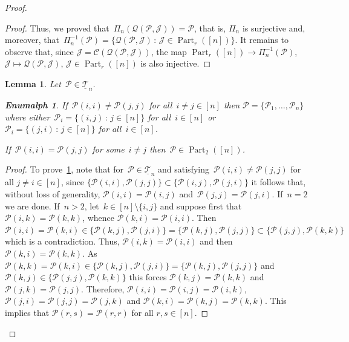 \documentclass[10pt,a4paper]{amsart}
\newtheorem{lemma}{Lemma}
\newtheorem{enumalph}{Enumalph}
\DeclareMathOperator{\Part}{Part}
\begin{document}
\begin{proof}
\begin{proof}
Thus, we proved that~$\Pi_n(\mathcal Q(\mathcal P,\mathcal J))=
\mathcal P$, that is, $\Pi_n$ is surjective and, moreover,
that~$\Pi^{-1}_n(\mathcal P)=\{ \mathcal Q(\mathcal P,\mathcal J)\,:\,
\mathcal J\in \Part_r([n])\}$. It remains to observe that,
since $\mathcal J=\mathcal C(\mathcal Q(\mathcal P,\mathcal J))$,
the map $\Part_r([n])\to \Pi_n^{-1}(\mathcal P)$, $\mathcal J\mapsto 
\mathcal Q(\mathcal P,\mathcal J)$, $\mathcal J\in\Part_r([n])$
is also injective.
\end{proof}
\begin{lemma}\label{lem:trans count last}
Let~$\mathcal P\in \underline{\mathscr T}_n$.
\begin{enumalph}
\item\label{lem:trans count last.a} If~$\mathcal P(i,i)\not=\mathcal P(j,j)$ for all~$i\not=j\in[n]$
then $\mathcal P=\{ \mathcal P_1,\dots,\mathcal P_n\}$ where 
either~$\mathcal P_i=\{ (i,j)\,:\, j\in[n]\}$ for all~$i\in [n]$
or~$\mathcal P_i=\{ (j,i)\,:\, j\in [n]\}$ for all~$i\in[n]$.

\item\label{lem:trans count last.b} If~$\mathcal P(i,i)=\mathcal P(j,j)$ for some~$i\not=j$ then~$\mathcal P\in \Part_2([n])$. 
\end{enumalph}
\end{lemma}
\begin{proof}
To prove~\ref{lem:trans count last.a}, 
note that for~$\mathcal P\in\underline{\mathscr T}_n$
and satisfying~$\mathcal P(i,i)\not=\mathcal P(j,j)$ for all $j\not=i\in[n]$, since
$\{\mathcal P(i,i),\mathcal P(j,j)\}\subset \{\mathcal P(i,j),\mathcal P(j,i)\}$
it follows that, without loss of generality, 
$\mathcal P(i,i)=\mathcal P(i,j)$ and~$\mathcal P(j,j)=\mathcal P(j,i)$.
If~$n=2$ we are done. If~$n>2$, let~$k\in[n]\setminus\{i,j\}$
and suppose first that $\mathcal P(i,k)=\mathcal P(k,k)$, whence $\mathcal P(k,i)=\mathcal P(i,i)$. Then $\mathcal P(i,i)=\mathcal P(k,i)\in
\{\mathcal P(k,j),\mathcal P(j,i)\}=\{\mathcal P(k,j),\mathcal P(j,j)\}
\subset \{\mathcal P(j,j),\mathcal P(k,k)\}$ which is a contradiction. Thus,
$\mathcal P(i,k)=\mathcal P(i,i)$ and then $\mathcal P(k,i)=\mathcal P(k,k)$. As $\mathcal P(k,k)=\mathcal P(k,i)\in\{\mathcal P(k,j),\mathcal P(j,i)\}
=\{\mathcal P(k,j),\mathcal P(j,j)\}$ and $\mathcal P(k,j)\in\{\mathcal P(j,j),\mathcal P(k,k)\}$ this forces $\mathcal P(k,j)=\mathcal P(k,k)$ and $\mathcal P(j,k)=\mathcal P(j,j)$.
Therefore, $\mathcal P(i,i)=\mathcal P(i,j)=\mathcal P(i,k)$, $\mathcal P(j,i)=\mathcal P(j,j)=\mathcal P(j,k)$ and $\mathcal P(k,i)=\mathcal P(k,j)=\mathcal P(k,k)$.
This implies that $\mathcal P(r,s)=\mathcal P(r,r)$ for all $r,s\in[n]$. 


\end{proof}
\end{proof}
\end{document}

